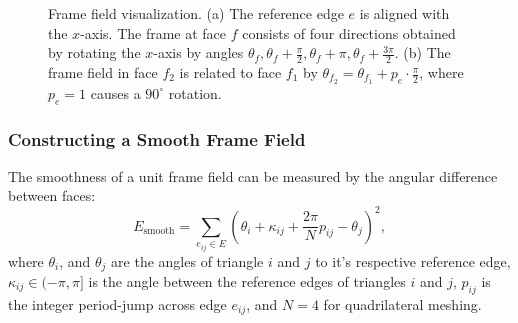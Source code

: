 \documentclass[12pt, letterpaper]{article}
\begin{document}
\begin{figure}[H]
\begin{minipage}[b]{0.48\textwidth}
\subcaption{}
\label{fig:period_jump}
\end{minipage}
\caption{Frame field visualization. (a) The reference edge $e$ is aligned with the $x$-axis. The frame at face $f$ consists of four directions obtained by rotating the $x$-axis by angles $\theta_f, \theta_f + \frac{\pi}{2}, \theta_f + \pi, \theta_f + \frac{3\pi}{2}$. (b) The frame field in face $f_2$ is related to face $f_1$ by $\theta_{f_2} = \theta_{f_1} + p_e \cdot \frac{\pi}{2}$, where $p_e = 1$ causes a $90^\circ$ rotation.}
\label{fig:frame_field_combined}
\end{figure}

\subsubsection{Constructing a Smooth Frame Field}
The smoothness of a unit frame field can be measured by the angular difference between faces:
\begin{equation}\label{eq:smooth_energy}
    E_\text{smooth} = \sum_{e_{ij} \in E} \left(\theta_i + \kappa_{ij} + \frac{2\pi}{N} p_{ij} - \theta_j\right)^2,
\end{equation}
where $\theta_i$, and $\theta_j$ are the angles of triangle $i$ and $j$ to it's respective reference edge, $\kappa_{ij} \in (-\pi, \pi]$ is the angle between the reference edges of triangles $i$ and $j$, $p_{ij}$ is the integer period-jump across edge $e_{ij}$, and $N=4$ for quadrilateral meshing.
\end{document}
